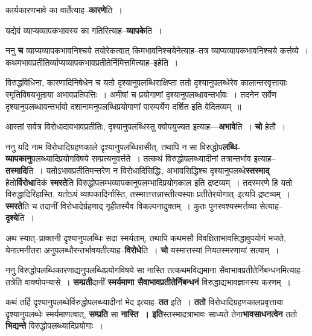\documentclass[article,12pt,a4paper]{memoir}
\begin{document}
	  \pstart कार्यकारणभावे का वार्तेत्याह--\textbf{कारणे}ति ।
	\pend
      

	  \pstart यद्येवं व्याप्यव्यापकभावस्य का गतिरित्याह--\textbf{व्यापके}ति ।
	\pend
      

	  \pstart ननु \textbf{च} व्याप्यव्यापकभावनिश्चये तयोरेकत्वात् किमभावनिश्चयेनेत्याह--तत्र व्याप्यव्यापकभावनिश्चये कर्त्त\leavevmode{}व्ये । कथमभावप्रतीतिर्व्याप्यव्यापकभावप्रतीतेर्निमित्तमित्याह--इहेति ।
	\pend
	  \bigskip
	  \begingroup
	

	  \pstart विरुद्धविधिना, कारणादिनिषेधेन च यतो दृश्यानुपलब्धिराक्षिप्ता ततो दृश्यानुपलब्धेरेव कालान्तरवृत्तायाः स्मृतिविषयभूताया अभावप्रतिपत्तिः । अमीषां च प्रयोगाणां दृश्यानुपलब्धावन्तर्भावः । तदनेन सर्वेण दृश्यानुपलब्धावन्तर्भावो दशानामनुपलब्धिप्रयोगाणां पारम्पर्येण दर्शित इति वेदितव्यम् ॥
	\pend
      
	  \endgroup
	

	  \pstart आस्तां सर्वत्र विरोधादावभावप्रतीतिः, दृश्यानुपलब्धिस्तु क्वोपयुज्यत इत्याह—\textbf{अभावे}ति । \textbf{चो} हेतौ ।
	\pend
      

	  \pstart ननु यदि नाम विरोधादिग्रहणकाले दृश्यानुपलब्धिरासीत्, तथापि न सा विरुद्धोप\textbf{लब्धि-व्यापकानु}पलब्ध्यादिप्रयोगविषये सम्प्रत्यनुवर्त्तते । तत्कथं विरुद्धोपलब्ध्यादीनां तत्रान्तर्भाव इत्याह--\textbf{तस्मादि}ति । यतोऽभावप्रतीतिमन्तरेण न विरोधादिसिद्धिः, अभावसिद्धिश्च दृश्यानुपलब्धे\textbf{स्तस्माद्} हेतो\textbf{र्विरोधा}दिकं \textbf{स्मरते}ति विरुद्धोपलम्भव्यापकानुपलम्भादिप्रयोगकाल इति द्रष्टव्यम् । तदस्मरणे हि यतो विरुद्धादिरिहास्ति, यतोऽयं व्यापकादिर्नास्ति, तस्मात्तत्तन्नास्तीत्यस्याः प्रतीतेरयोगात्--इत्यपि द्रष्टव्यम् । \textbf{स्मरते}ति च तदानीं विरोधादेर्ग्रहणाद् गृहीतस्यैव विकल्पनादुक्तम् । कुतः पुनरवश्यस्मर्त्तव्या सेत्याह--\textbf{दृश्ये}ति ।
	\pend
      

	  \pstart अथ स्यात्--प्राक्तनी दृश्यानुपलब्धिः सदा स्मर्यताम्, तथापि कथमसौ विवक्षिताभावसिद्धावुपयोगं भजते, येनात्मनीतरा अनुपलब्धौरन्तर्भावयतीत्याह--\textbf{विरोधे}ति । \textbf{चो} यस्मात्तस्यां नियतस्मरणायां सत्याम् ।
	\pend
      

	  \pstart ननु विरुद्धोपलब्धिकारणाद्यनुपलब्धिप्रयोगविषये सा नास्ति तत्कथमविद्यमाना सैवाभावप्रतीतेर्निबन्धनमित्याह--तत्रेति वाक्योपन्यासे । \textbf{सम्प्रती}दानीं \textbf{स्मर्यमाणा सैवाभावप्रतीतेर्निबन्धनं} विरुद्धाद्यभावज्ञानस्य करणम् ।
	\pend
      

	  \pstart कथं तर्हि दृश्यानुपलब्धेर्विरुद्धोपलब्ध्यादीनां भेद इत्याह--\textbf{तत} इति । \textbf{ततो} विरोधादिग्रहणकालप्रवृत्ताया दृश्यानुपलब्धेः स्मर्यमाणत्वात्, \textbf{सम्प्रति} सा \textbf{नास्ति । इति}स्तस्मादत्राभावः साध्यते तेना\textbf{भावसाधनत्वेन} ततो \textbf{भिद्यन्ते} विरुद्धोपलब्ध्यादिप्रयोगाः ।
	\pend
      
\end{document}
